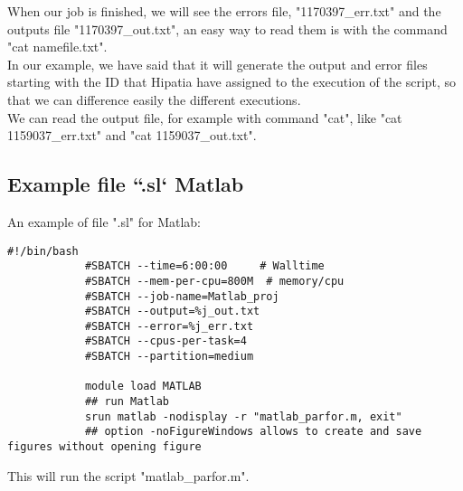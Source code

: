 \documentclass[a4paper]{article}
\begin{document}
            When our job is finished, we will see the errors file, "1170397\_err.txt" and the outputs file "1170397\_out.txt", an easy way to read them is with the command "cat namefile.txt".\\
			In our example, we have said that it will generate the output and error files starting with the ID that Hipatia have assigned to the execution of the script, so that we can difference easily the different executions.\\
			We can read the output file, for example with command "cat", like "cat 1159037\_err.txt" and "cat 1159037\_out.txt".\\
	\subsection{ Example file ``.sl` Matlab}
		An example of file ".sl" for Matlab:
		\begin{lstlisting}[caption=scp command, label=lst:scpCommand]
			#!/bin/bash
			#SBATCH --time=6:00:00     # Walltime 
			#SBATCH --mem-per-cpu=800M  # memory/cpu 
			#SBATCH --job-name=Matlab_proj 
			#SBATCH --output=%j_out.txt
			#SBATCH --error=%j_err.txt
			#SBATCH --cpus-per-task=4 
			#SBATCH --partition=medium
			
			module load MATLAB
			## run Matlab
			srun matlab -nodisplay -r "matlab_parfor.m, exit" 
			## option -noFigureWindows allows to create and save figures without opening figure
		\end{lstlisting}
		This will run the script "matlab\_parfor.m".
\end{document}
